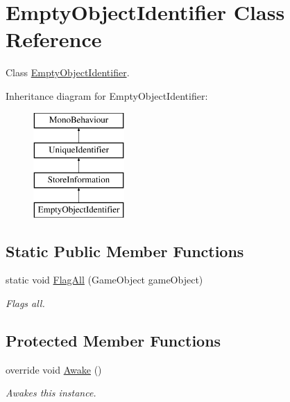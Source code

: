 \hypertarget{class_empty_object_identifier}{}\section{Empty\+Object\+Identifier Class Reference}
\label{class_empty_object_identifier}


Class \hyperlink{class_empty_object_identifier}{Empty\+Object\+Identifier}.  


Inheritance diagram for Empty\+Object\+Identifier\+:\begin{figure}[H]
\begin{center}
\leavevmode
\includegraphics[height=4.000000cm]{class_empty_object_identifier}
\end{center}
\end{figure}
\subsection*{Static Public Member Functions}
\begin{DoxyCompactItemize}
\item 
static void \hyperlink{class_empty_object_identifier_ad2d9725d5326b826351ed11c539934d5}{Flag\+All} (Game\+Object game\+Object)
\begin{DoxyCompactList}\small\item\em Flags all. \end{DoxyCompactList}\end{DoxyCompactItemize}
\subsection*{Protected Member Functions}
\begin{DoxyCompactItemize}
\item 
override void \hyperlink{class_empty_object_identifier_abb11a8f33d5c145640db3e69b6d34f10}{Awake} ()
\begin{DoxyCompactList}\small\item\em Awakes this instance. \end{DoxyCompactList}\end{DoxyCompactItemize}
